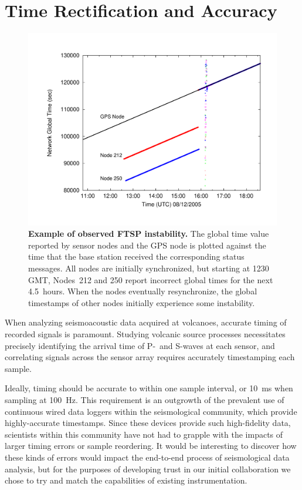 \section{Time Rectification and Accuracy}
\label{evaluation-sec-timing}

\begin{figure}[t!]
\begin{center}
\includegraphics[width=\hsize]{./3-evaluation/figs/globaltimeproblem.pdf}
\end{center}

\caption{\textbf{Example of observed FTSP instability.} The global time value
reported by sensor nodes and the GPS node is plotted against the time that
the base station received the corresponding status messages. All nodes are
initially synchronized, but starting at 1230 GMT, Nodes~212 and 250 report
incorrect global times for the next 4.5~hours. When the nodes eventually
resynchronize, the global timestamps of other nodes initially experience some
instability.}

\label{evaluation-fig-globaltimeproblem}
\end{figure}

When analyzing seismoacoustic data acquired at volcanoes, accurate timing of
recorded signals is paramount. Studying volcanic source processes
necessitates precisely identifying the arrival time of P-~and S-waves at each
sensor, and correlating signals across the sensor array requires accurately
timestamping each sample.

Ideally, timing should be accurate to within one sample interval, or 10~ms
when sampling at 100~Hz. This requirement is an outgrowth of the prevalent
use of continuous wired data loggers within the seismological community,
which provide highly-accurate timestamps. Since these devices provide such
high-fidelity data, scientists within this community have not had to grapple
with the impacts of larger timing errors or sample reordering. It would be
interesting to discover how these kinds of errors would impact the end-to-end
process of seismological data analysis, but for the purposes of developing
trust in our initial collaboration we chose to try and match the capabilities
of existing instrumentation.

